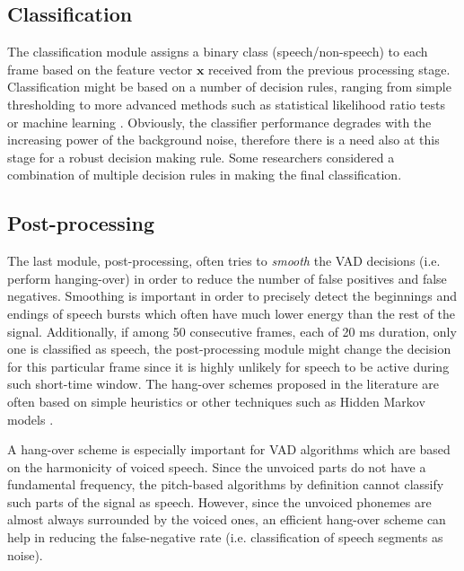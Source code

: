 \subsection{Classification}

The classification module assigns a binary class (speech/non-speech) to each frame based on the feature vector $\mathbf{x}$ received from the previous processing stage. Classification might be based on a number of decision rules, ranging from simple thresholding \cite{G729} to more advanced methods such as statistical likelihood ratio tests \cite{Sohn, ImprovedLikelihood, SohnInitial} or machine learning \cite{XiaoLei, Stadtschnitzer}. Obviously, the classifier performance degrades with the increasing power of the background noise, therefore there is a need also at this stage for a robust decision making rule. Some researchers \cite{Kida} considered a combination of multiple decision rules in making the final classification.

\subsection{Post-processing}

The last module, post-processing, often tries to \emph{smooth} the VAD decisions (i.e. perform hanging-over) in order to reduce the number of false positives and false negatives. Smoothing is important in order to precisely detect the beginnings and endings of speech bursts which often have much lower energy than the rest of the signal. Additionally, if among 50 consecutive frames, each of 20 ms duration, only one is classified as speech, the post-processing module might change the decision for this particular frame since it is highly unlikely for speech to be active during such short-time window. The hang-over schemes  proposed in the literature are often based on simple heuristics \cite{G729, ETSIHangover} or other techniques such as Hidden Markov models \cite{Sohn}.

A hang-over scheme is especially important for VAD algorithms which are based on the harmonicity of voiced speech. Since the unvoiced parts do not have a fundamental frequency, the pitch-based algorithms by definition cannot classify such parts of the signal as speech. However, since the unvoiced phonemes are almost always surrounded by the voiced ones, an efficient hang-over scheme can help in reducing the false-negative rate (i.e. classification of speech segments as noise).


